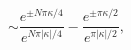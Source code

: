 \begin{equation}
\sim\frac{e^{\pm N\pi\kappa/4}}{e^{N\pi|\kappa|/4}}
-\frac{e^{\pm\pi\kappa/2}}{e^{\pi|\kappa|/2}},
\label{B7.5}
\end{equation}

